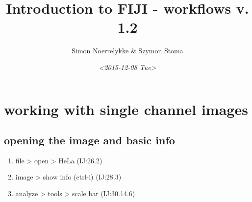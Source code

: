 \documentclass[11pt]{article}
\author{Simon Noerrelykke \& Szymon Stoma}
\date{\textit{<2015-12-08 Tue>}}
\title{Introduction to FIJI - workflows v. 1.2}
\begin{document}
\maketitle
\tableofcontents

\section{working with single channel images}
\label{sec-1}
\subsection{opening the image and basic info}
\label{sec-1-1}
\begin{enumerate}
\item file > open > HeLa (IJ:26.2)
\item image > show info (ctrl-i) (IJ:28.3)
\item analyze > tools > scale bar (IJ:30.14.6)
\end{enumerate}
\end{document}
